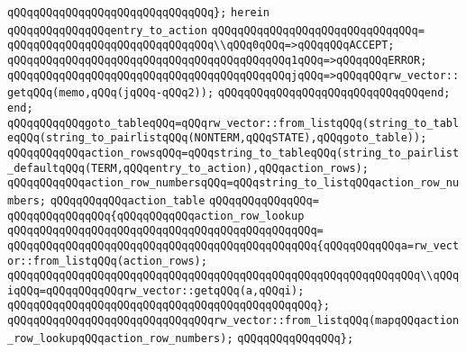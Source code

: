 \verb|qQQqqQQqqQQqqQQqqQQqqQQqqQQqqQQq};|\newline
\verb|herein|\newline
\verb|qQQqqQQqqQQqqQQqentry_to_action|\newline
\verb|qQQqqQQqqQQqqQQqqQQqqQQqqQQqqQQq=|\newline
\verb|qQQqqQQqqQQqqQQqqQQqqQQqqQQqqQQq\\qQQq0qQQq=>qQQqqQQqACCEPT;|\newline
\verb|qQQqqQQqqQQqqQQqqQQqqQQqqQQqqQQqqQQqqQQqqQQq1qQQq=>qQQqqQQqERROR;|\newline
\verb|qQQqqQQqqQQqqQQqqQQqqQQqqQQqqQQqqQQqqQQqqQQqjqQQq=>qQQqqQQqrw_vector::getqQQq(memo,qQQq(jqQQq-qQQq2));|\newline
\verb|qQQqqQQqqQQqqQQqqQQqqQQqqQQqqQQqend;|\newline
\verb|end;|\newline
\newline
\verb|qQQqqQQqqQQqgoto_tableqQQq=qQQqrw_vector::from_listqQQq(string_to_tableqQQq(string_to_pairlistqQQq(NONTERM,qQQqSTATE),qQQqgoto_table));|\newline
\verb|qQQqqQQqqQQqaction_rowsqQQq=qQQqstring_to_tableqQQq(string_to_pairlist_defaultqQQq(TERM,qQQqentry_to_action),qQQqaction_rows);|\newline
\verb|qQQqqQQqqQQqaction_row_numbersqQQq=qQQqstring_to_listqQQqaction_row_numbers;|\newline
\verb|qQQqqQQqqQQqaction_table|\newline
\verb|qQQqqQQqqQQqqQQq=|\newline
\verb|qQQqqQQqqQQqqQQq{qQQqqQQqqQQqaction_row_lookup|\newline
\verb|qQQqqQQqqQQqqQQqqQQqqQQqqQQqqQQqqQQqqQQqqQQqqQQq=|\newline
\verb|qQQqqQQqqQQqqQQqqQQqqQQqqQQqqQQqqQQqqQQqqQQqqQQq{qQQqqQQqqQQqa=rw_vector::from_listqQQq(action_rows);|\newline
\newline
\verb|qQQqqQQqqQQqqQQqqQQqqQQqqQQqqQQqqQQqqQQqqQQqqQQqqQQqqQQqqQQqqQQq\\qQQqiqQQq=qQQqqQQqqQQqrw_vector::getqQQq(a,qQQqi);|\newline
\verb|qQQqqQQqqQQqqQQqqQQqqQQqqQQqqQQqqQQqqQQqqQQqqQQq};|\newline
\newline
\verb|qQQqqQQqqQQqqQQqqQQqqQQqqQQqqQQqrw_vector::from_listqQQq(mapqQQqaction_row_lookupqQQqaction_row_numbers);|\newline
\verb|qQQqqQQqqQQqqQQq};|\newline
